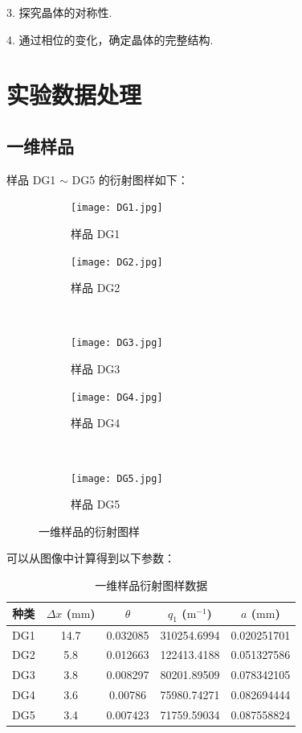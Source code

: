 \documentclass{customDoc}
\begin{document}
3. 探究晶体的对称性.

4. 通过相位的变化，确定晶体的完整结构.

\section{实验数据处理}

\subsection{一维样品}

样品 DG1 $\sim$ DG5 的衍射图样如下：

\begin{figure}[H]
    \begin{subfigure}[b]{0.45\textwidth}
        \texttt{[image: DG1.jpg]}
        \caption{样品 DG1}
        \label{fig:1D_1}
    \end{subfigure}
    \hfill
    \begin{subfigure}[b]{0.45\textwidth}
        \texttt{[image: DG2.jpg]}
        \caption{样品 DG2}
        \label{fig:1D_2}
    \end{subfigure}
    \\
    \begin{subfigure}[b]{0.45\textwidth}
        \texttt{[image: DG3.jpg]}
        \caption{样品 DG3}
        \label{fig:1D_3}
    \end{subfigure}
    \hfill
    \begin{subfigure}[b]{0.45\textwidth}
        \texttt{[image: DG4.jpg]}
        \caption{样品 DG4}
        \label{fig:1D_4}
    \end{subfigure}
    \\
    \begin{subfigure}[b]{0.45\textwidth}
        \texttt{[image: DG5.jpg]}
        \caption{样品 DG5}
        \label{fig:1D_5}
    \end{subfigure}
    \caption{一维样品的衍射图样}
    \label{fig:1D}
\end{figure}

可以从图像中计算得到以下参数：

\begin{table}[H]
  \centering
    \begin{tabular}{|c|c|c|c|c|}
    \hline
    种类    & $\Delta x$ ($\si{\milli\metre}$) & $\theta$     &  $q_1$ ($\si{\metre}^{-1}$) & $a$ ($\si{\milli\metre}$) \\
    \hline
    DG1   & 14.7  & 0.032085 & 310254.6994 & 0.020251701 \\
    \hline
    DG2   & 5.8   & 0.012663 & 122413.4188 & 0.051327586 \\
    \hline
    DG3   & 3.8   & 0.008297 & 80201.89509 & 0.078342105 \\
    \hline
    DG4   & 3.6   & 0.00786 & 75980.74271 & 0.082694444 \\
    \hline
    DG5   & 3.4   & 0.007423 & 71759.59034 & 0.087558824 \\
    \hline
    \end{tabular}%
    \caption{一维样品衍射图样数据}
  \label{tab:1}%
\end{table}%
\end{document}
